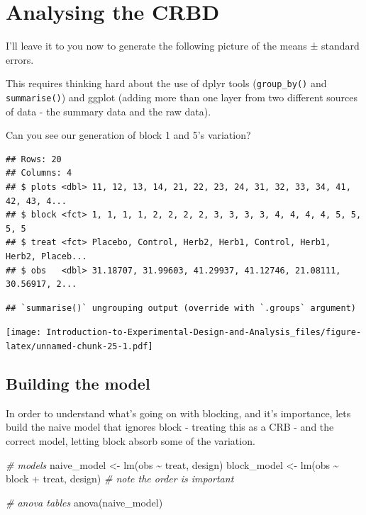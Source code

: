 \documentclass[
]{book}
\newenvironment{Shaded}{\begin{snugshade}}{\end{snugshade}}
\newcommand{\CommentTok}[1]{\textcolor[rgb]{0.56,0.35,0.01}{\textit{#1}}}
\newcommand{\FunctionTok}[1]{\textcolor[rgb]{0.00,0.00,0.00}{#1}}
\newcommand{\NormalTok}[1]{#1}
\newcommand{\OtherTok}[1]{\textcolor[rgb]{0.56,0.35,0.01}{#1}}
\newcommand{\SpecialCharTok}[1]{\textcolor[rgb]{0.00,0.00,0.00}{#1}}
\begin{document}
\hypertarget{analysing-the-crbd}{%
\section{Analysing the CRBD}\label{analysing-the-crbd}}

I'll leave it to you now to generate the following picture of the means ± standard errors.

This requires thinking hard about the use of dplyr tools (\texttt{group\_by()} and \texttt{summarise()}) and ggplot (adding more than one layer from two different sources of data - the summary data and the raw data).

Can you see our generation of block 1 and 5's variation?

\begin{verbatim}
## Rows: 20
## Columns: 4
## $ plots <dbl> 11, 12, 13, 14, 21, 22, 23, 24, 31, 32, 33, 34, 41, 42, 43, 4...
## $ block <fct> 1, 1, 1, 1, 2, 2, 2, 2, 3, 3, 3, 3, 4, 4, 4, 4, 5, 5, 5, 5
## $ treat <fct> Placebo, Control, Herb2, Herb1, Control, Herb1, Herb2, Placeb...
## $ obs   <dbl> 31.18707, 31.99603, 41.29937, 41.12746, 21.08111, 30.56917, 2...
\end{verbatim}

\begin{verbatim}
## `summarise()` ungrouping output (override with `.groups` argument)
\end{verbatim}

\texttt{[image: Introduction-to-Experimental-Design-and-Analysis\_files/figure-latex/unnamed-chunk-25-1.pdf]}

\hypertarget{building-the-model}{%
\subsection{Building the model}\label{building-the-model}}

In order to understand what's going on with blocking, and it's importance, lets build the naive model that ignores block - treating this as a CRB - and the correct model, letting block absorb some of the variation.

\begin{Shaded}
\begin{Highlighting}[]
\CommentTok{\# models}
\NormalTok{naive\_model }\OtherTok{\textless{}{-}} \FunctionTok{lm}\NormalTok{(obs }\SpecialCharTok{\textasciitilde{}}\NormalTok{ treat, design)}
\NormalTok{block\_model }\OtherTok{\textless{}{-}} \FunctionTok{lm}\NormalTok{(obs }\SpecialCharTok{\textasciitilde{}}\NormalTok{ block }\SpecialCharTok{+}\NormalTok{ treat, design) }\CommentTok{\# note the order is important}

\CommentTok{\# anova tables}
\FunctionTok{anova}\NormalTok{(naive\_model)}
\end{Highlighting}
\end{Shaded}
\end{document}
